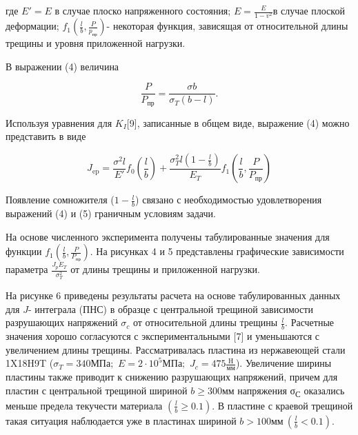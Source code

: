 \begin{multicols}{2}
где $E'=E$ в случае плоско напряженного
состояния; $E=\frac{E}{1-v^{2}}$в случае плоской
деформации; $f_{1} \left( \frac{l}{b}, \frac{P}{p_{\text{пр}}} \right)$- некоторая функция,
зависящая от относительной длины трещины и уровня приложенной нагрузки.

В выражении (4) величина

\begin{equation*}
\frac{P}{P_{\text{пр}}} = \frac{\sigma b}{\sigma_{T} \left( b - l \right)}.
\end{equation*}

Используя уравнения для $K_{I}${[}9{]},
записанные в общем виде, выражение (4) можно представить в виде
\end{multicols}

\begin{equation}
J_{\text{ep}} = \frac{\sigma^{2} l}{E'} f_{0} \left( \frac{l}{b} \right) + \frac{\sigma_{T}^{2} l \left(1 - \frac{l}{b}\right)}{E_{T}} f_{1} \left( \frac{l}{b}, \frac{P}{P_{\text{пр}}} \right)
\end{equation}

\begin{multicols}{2}
Появление сомножителя ($1-\frac{l}{b}$) связано с
необходимостью удовлетворения выражений (4) и (5) граничным условиям
задачи.

На основе численного эксперимента получены табулированные значения для
функции $f_{1} \left( \frac{l}{b}, \frac{P}{P_{\text{пр}}} \right)$. На рисунках 4 и 5
представлены графические зависимости параметра
$\frac{J_{p} E_{T}}{\sigma_{T}^{2}}$ от длины трещины и приложенной
нагрузки.

На рисунке 6 приведены результаты расчета на основе табулированных
данных для $J$- интеграла (ПНС) в
образце с центральной трещиной зависимости разрушающих напряжений
$\sigma_{c}$ от относительной длины трещины
$\frac{l}{b}$. Расчетные значения хорошо
согласуются с экспериментальными {[}7{]} и уменьшаются с увеличением
длины трещины. Рассматривалась пластина из нержавеющей стали 1X18H9T
($\sigma_{T} = 340 \text{МПа};$ $E = 2 \cdot 10^{5} \text{МПа};$ $J_{c} = 475 \frac{\text{H}}{\text{мм}}$).
Увеличение ширины пластины также приводит к снижению разрушающих
напряжений, причем для пластин с центральной трещиной шириной
$b \geq 300 \text{мм}$ напряжения σ\textsubscript{С}
оказались меньше предела текучести материала
$\left( \frac{l}{b} \geq 0.1 \right)$. В пластине с краевой трещиной такая
ситуация наблюдается уже в пластинах шириной
$b > 100 \text{мм}\ \left( \frac{l}{b} < 0.1 \right)$.
\end{multicols}

